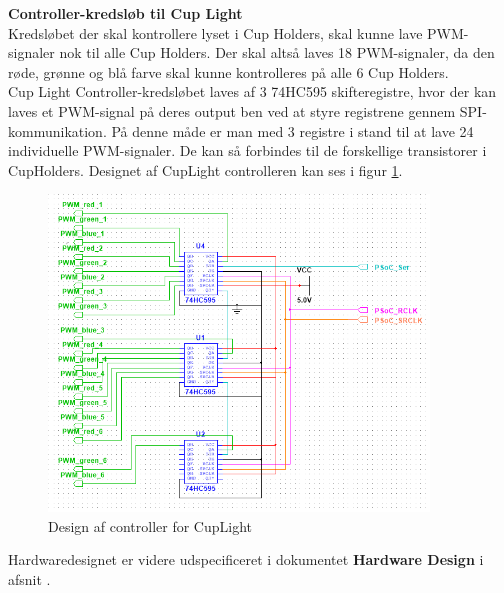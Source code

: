 \documentclass[Rapport/Rapport_main.tex]{subfiles}
\begin{document}
\textbf{Controller-kredsløb til Cup Light}\\
Kredsløbet der skal kontrollere lyset i Cup Holders, skal kunne lave PWM-signaler nok til alle Cup Holders. Der skal altså laves 18 PWM-signaler, da den røde, grønne og blå farve skal kunne kontrolleres på alle 6 Cup Holders.\\
Cup Light Controller-kredsløbet laves af 3 74HC595 skifteregistre\cite{datasheet_shiftreg}, hvor der kan laves et PWM-signal på deres output ben ved at styre registrene gennem SPI-kommunikation. På denne måde er man med 3 registre i stand til at lave 24 individuelle PWM-signaler. De kan så forbindes til de forskellige transistorer i CupHolders. Designet af CupLight controlleren kan ses i figur \ref{fig:rap_cuplight_controller}.
\begin{figure}[H]
    \centering
    \includegraphics[width=0.9\textwidth]{HardwareDesign/CupLight/graphics/CupLight_HW_Controller.png}
    \caption{Design af controller for CupLight}
    \label{fig:rap_cuplight_controller}
\end{figure}
Hardwaredesignet er videre udspecificeret i dokumentet \textbf{Hardware Design} i afsnit .
\end{document}
